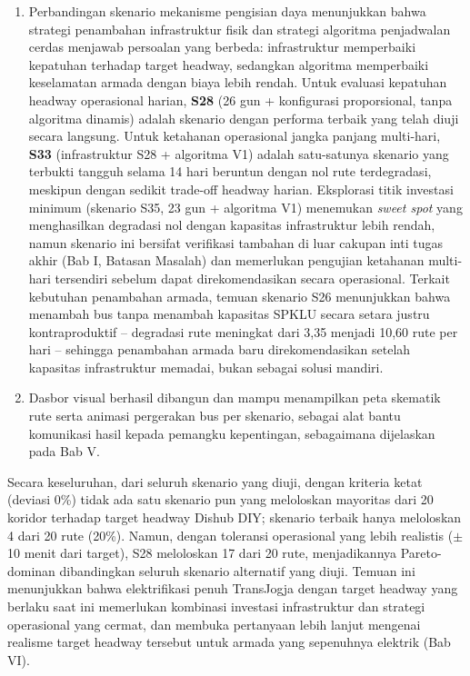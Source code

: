 \begin{enumerate}
	memberikan tingkat degradasi rute mendekati nol.
	\item Perbandingan skenario mekanisme pengisian daya menunjukkan bahwa
	strategi penambahan infrastruktur fisik dan strategi algoritma
	penjadwalan cerdas menjawab persoalan yang berbeda: infrastruktur
	memperbaiki kepatuhan terhadap target headway, sedangkan algoritma
	memperbaiki keselamatan armada dengan biaya lebih rendah.
	Untuk evaluasi kepatuhan headway operasional harian, \textbf{S28}
	(26 gun + konfigurasi proporsional, tanpa algoritma dinamis) adalah
	skenario dengan performa terbaik yang telah diuji secara langsung.
	Untuk ketahanan operasional jangka panjang multi-hari, \textbf{S33}
	(infrastruktur S28 + algoritma V1) adalah satu-satunya skenario yang
	terbukti tangguh selama 14 hari beruntun dengan nol rute terdegradasi,
	meskipun dengan sedikit trade-off headway harian. Eksplorasi titik
	investasi minimum (skenario S35, 23 gun + algoritma V1) menemukan
	\textit{sweet spot} yang menghasilkan degradasi nol dengan kapasitas
	infrastruktur lebih rendah, namun skenario ini bersifat verifikasi
	tambahan di luar cakupan inti tugas akhir (Bab I, Batasan Masalah)
	dan memerlukan pengujian ketahanan multi-hari tersendiri sebelum dapat
	direkomendasikan secara operasional. Terkait kebutuhan penambahan
	armada, temuan skenario S26 menunjukkan bahwa menambah bus tanpa
	menambah kapasitas SPKLU secara setara justru kontraproduktif --
	degradasi rute meningkat dari 3,35 menjadi 10,60 rute per hari --
	sehingga penambahan armada baru direkomendasikan setelah kapasitas
	infrastruktur memadai, bukan sebagai solusi mandiri.
	\item Dasbor visual berhasil dibangun dan mampu menampilkan peta
	skematik rute serta animasi pergerakan bus per skenario, sebagai alat
	bantu komunikasi hasil kepada pemangku kepentingan, sebagaimana
	dijelaskan pada Bab V.
\end{enumerate}

Secara keseluruhan, dari seluruh skenario yang diuji, dengan kriteria ketat
(deviasi 0\%) tidak ada satu skenario pun yang meloloskan mayoritas dari 20
koridor terhadap target headway Dishub DIY; skenario terbaik hanya meloloskan
4 dari 20 rute (20\%). Namun, dengan toleransi operasional yang lebih realistis
($\pm$10 menit dari target), S28 meloloskan 17 dari 20 rute, menjadikannya
Pareto-dominan dibandingkan seluruh skenario alternatif yang diuji. Temuan ini
menunjukkan bahwa elektrifikasi penuh TransJogja dengan target headway yang
berlaku saat ini memerlukan kombinasi investasi infrastruktur dan strategi
operasional yang cermat, dan membuka pertanyaan lebih lanjut mengenai realisme
target headway tersebut untuk armada yang sepenuhnya elektrik (Bab VI).


